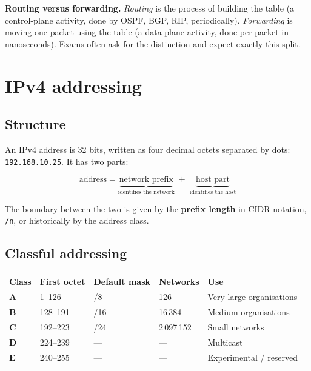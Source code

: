 \documentclass[11pt,a4paper]{article}
\begin{document}
\begin{solbox}
\begin{dangerbox}
\textbf{Routing versus forwarding.} \emph{Routing} is the process of building the table (a control-plane activity, done by OSPF, BGP, RIP, periodically). \emph{Forwarding} is moving one packet using the table (a data-plane activity, done per packet in nanoseconds). Exams often ask for the distinction and expect exactly this split.
\end{dangerbox}
\end{solbox}

\section{IPv4 addressing}

\subsection{Structure}

An IPv4 address is 32 bits, written as four decimal octets separated by dots: \texttt{192.168.10.25}. It has two parts:

\[
\text{address} = \underbrace{\text{network prefix}}_{\text{identifies the network}} \;+\; \underbrace{\text{host part}}_{\text{identifies the host}}
\]

The boundary between the two is given by the \textbf{prefix length} in CIDR notation, \texttt{/n}, or historically by the address class.

\subsection{Classful addressing}

\begin{center}\small
\begin{tabularx}{\textwidth}{>{\bfseries}p{} p{} p{} p{} X}
\toprule Class & First octet & Default mask & Networks & Use\\
\midrule
A & 1--126 & /8 & 126 & Very large organisations\\
B & 128--191 & /16 & 16\,384 & Medium organisations\\
C & 192--223 & /24 & 2\,097\,152 & Small networks\\
D & 224--239 & --- & --- & Multicast\\
E & 240--255 & --- & --- & Experimental / reserved\\
\bottomrule
\end{tabularx}
\end{center}
\end{document}
